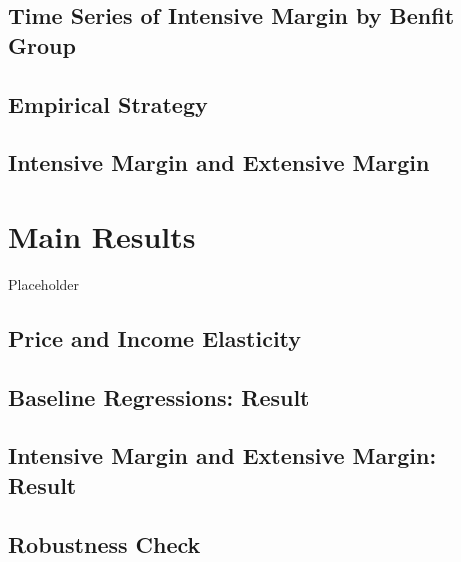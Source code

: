 \documentclass[ review  , 3p ]{elsarticle}
\begin{document}
  \hypertarget{time-series-of-intensive-margin-by-benfit-group}{%
  \subsection{Time Series of Intensive Margin by Benfit Group}\label{time-series-of-intensive-margin-by-benfit-group}}
  
  \hypertarget{empirical-strategy}{%
  \subsection{Empirical Strategy}\label{empirical-strategy}}
  
  \hypertarget{intensive-margin-and-extensive-margin}{%
  \subsection{Intensive Margin and Extensive Margin}\label{intensive-margin-and-extensive-margin}}
  
  \hypertarget{main-results}{%
  \section{Main Results}\label{main-results}}
  
  Placeholder
  
  \hypertarget{price-and-income-elasticity}{%
  \subsection{Price and Income Elasticity}\label{price-and-income-elasticity}}
  
  \hypertarget{baseline-regressions-result}{%
  \subsection{Baseline Regressions: Result}\label{baseline-regressions-result}}
  
  \hypertarget{intensive-margin-and-extensive-margin-result}{%
  \subsection{Intensive Margin and Extensive Margin: Result}\label{intensive-margin-and-extensive-margin-result}}
  
  \hypertarget{robustness-check}{%
  \subsection{Robustness Check}\label{robustness-check}}
  
\end{document}
